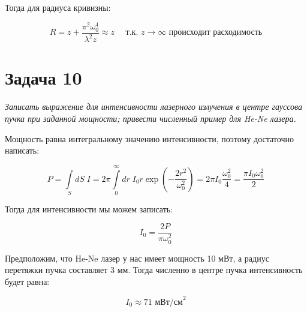 \documentclass[a4paper, 12pt]{article}
\begin{document}
Тогда для радиуса кривизны:

\begin{equation}
	R = z + \frac{\pi^2\omega_0^4}{\lambda^2 z} \approx z \quad \text{ т.к. $z\rightarrow \infty$ происходит расходимость}
\end{equation}

\section{Задача 10}

\textit{ Записать выражение для интенсивности лазерного излучения в центре гауссова пучка при заданной мощности; привести численный пример для He-Ne лазера.}

Мощность равна интегральному значению интенсивности, поэтому достаточно написать:

\begin{equation}
	P = \int\limits_S dS\;  I = 2\pi \int\limits_0^\infty dr \; I_0 r \exp\left(-\frac{2 r^2}{\omega_0^2}\right) = 2\pi I_0 \frac{\omega_0^2}{4} = \frac{\pi I_0 \omega_0^2}{2}
\end{equation}

Тогда для интенсивности мы можем записать:

\begin{equation}
	I_0 = \frac{2P}{\pi \omega_0^2}
\end{equation}

Предположим, что He-Ne лазер у нас имеет мощность 10 мВт, а радиус перетяжки пучка составляет 3 мм. Тогда численно в центре пучка интенсивность будет равна:

\begin{equation}
	I_0 \approx 71 \text{ мВт/см}^2
\end{equation}
\end{document}
